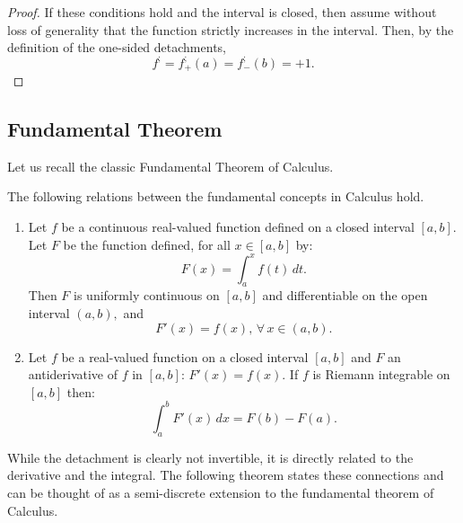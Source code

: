 \documentclass[11pt]{book}
\begin{document}
\begin{proof}
If these conditions hold and the interval is closed, then assume without loss of generality that the function strictly increases in the interval. Then, by the definition of the one-sided detachments,
$$f^{;}=f^{;}_{+}\left(a\right)=f^{;}_{-}\left(b\right)=+1.$$
\end{proof}

\subsection{Fundamental Theorem}
\label{fundamental_section}
Let us recall the classic Fundamental Theorem of Calculus.
\begin{theorem}The following relations between the fundamental concepts in Calculus hold.
\begin{enumerate}
    \item 
    Let $f$ be a continuous real-valued function defined on a closed interval $[a,b]$. Let $F$ be the function defined, for all $x\in\left[a,b\right]$ by: 
$${\displaystyle F(x)=\int_{a}^{x}\!f(t)\,dt.}$$
Then $F$ is uniformly continuous on $[a,b]$ and differentiable on the open interval $(a,b),$ and
$${\displaystyle F'(x)=f(x),\,}\forall\,x\in\left(a,b\right).$$
    
    \item 
    Let $f$ be a real-valued function on a closed interval $\left[a,b\right]$ and $F$ an antiderivative of $f$ in $\left[a,b\right]$: $F'(x)=f(x)$.     If $f$ is Riemann integrable on $\left[a,b\right]$ then:
$$\int_{a}^{b}F'(x)\,dx=F(b)-F(a).$$
    \end{enumerate}
\label{ftc_1d}
\end{theorem}

While the detachment is clearly not invertible, it is directly related to the derivative and the integral. The following theorem states these connections and can be thought of as a semi-discrete extension to the fundamental theorem of Calculus.
\end{document}
